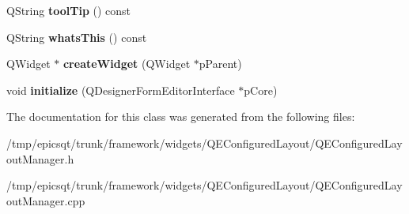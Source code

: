 \begin{DoxyCompactItemize}
\item 
\hypertarget{classQEConfiguredLayoutManager_a25f29d530c9bb170d5d8ca46a3231ff2}{
QString {\bfseries toolTip} () const }
\label{classQEConfiguredLayoutManager_a25f29d530c9bb170d5d8ca46a3231ff2}

\item 
\hypertarget{classQEConfiguredLayoutManager_a308b230451157108b4ec4ad6a12f9a78}{
QString {\bfseries whatsThis} () const }
\label{classQEConfiguredLayoutManager_a308b230451157108b4ec4ad6a12f9a78}

\item 
\hypertarget{classQEConfiguredLayoutManager_a02acfab5819fbe7a0906b55c7c46819f}{
QWidget $\ast$ {\bfseries createWidget} (QWidget $\ast$pParent)}
\label{classQEConfiguredLayoutManager_a02acfab5819fbe7a0906b55c7c46819f}

\item 
\hypertarget{classQEConfiguredLayoutManager_a5a3044d78248c473c20c3850e74c706a}{
void {\bfseries initialize} (QDesignerFormEditorInterface $\ast$pCore)}
\label{classQEConfiguredLayoutManager_a5a3044d78248c473c20c3850e74c706a}

\end{DoxyCompactItemize}


The documentation for this class was generated from the following files:\begin{DoxyCompactItemize}
\item 
/tmp/epicsqt/trunk/framework/widgets/QEConfiguredLayout/QEConfiguredLayoutManager.h\item 
/tmp/epicsqt/trunk/framework/widgets/QEConfiguredLayout/QEConfiguredLayoutManager.cpp\end{DoxyCompactItemize}
